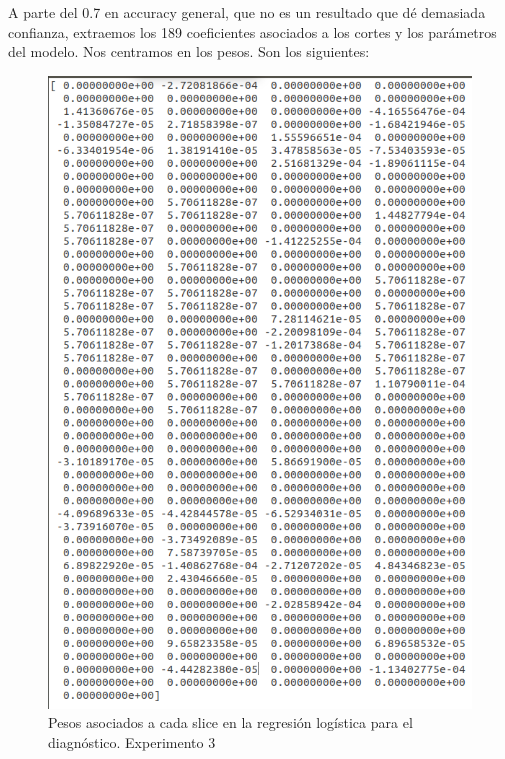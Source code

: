 A parte del 0.7 en accuracy general, que no es un resultado que dé demasiada confianza, extraemos los 189 coeficientes asociados a los cortes y los parámetros del modelo. Nos centramos en los pesos. Son los siguientes:


\begin{figure}[H] %
	\centering
	\includegraphics[scale=0.7]{probs-exp3.png}  %
	\caption{Pesos asociados a cada slice en la regresión logística para el diagnóstico. Experimento 3} 
	\label{fig:probs-exp3}
\end{figure}

